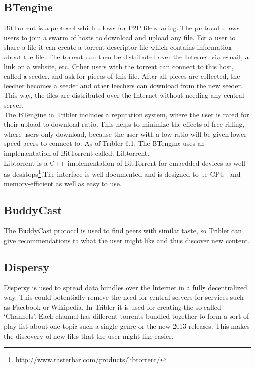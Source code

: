 \subsection{BTengine}
\label{sec:libtorrent_descr}
BitTorrent is a protocol which allows for P2P file sharing. The protocol allows users to join a swarm of hosts to download and upload any file. For a user to share a file it can create a torrent descriptor file which contains information about the file. The torrent can then be distributed over the Internet via e-mail, a link on a website, etc. Other users with the torrent can connect to this host, called a seeder, and ask for pieces of this file. After all pieces are collected, the leecher becomes a seeder and other leechers can download from the new seeder. This way, the files are distributed over the Internet without needing any central server.\\ 
The BTengine in Tribler includes a reputation system, where the user is rated for their upload to download ratio. This helps to minimize the effects of free riding, where users only download, because the user with a low ratio will be given lower speed peers to connect to. As of Tribler 6.1, The BTengine uses an implementation of BitTorrent called: Libtorrent.\\
Libtorrent is a C++ implementation of BitTorrent for embedded devices as well as desktops\footnote{http://www.rasterbar.com/products/libtorrent/}.The interface is well documented and is designed to be CPU- and memory-efficient as well as easy to use.

\subsection{BuddyCast}
The BuddyCast protocol is used to find peers with similar taste, so Tribler can give recommendations to what the user might like and thus discover new content. 

\subsection{Dispersy}
Dispersy is used to spread data bundles over the Internet in a fully decentralized way. This could potentially remove the need for central servers for services such as Facebook or Wikipedia. In Tribler it is used for creating the so called `Channels'. Each channel has different torrents bundled together to form a sort of play list about one topic such a single genre or the new 2013 releases. This makes the discovery of new files that the user might like easier.

